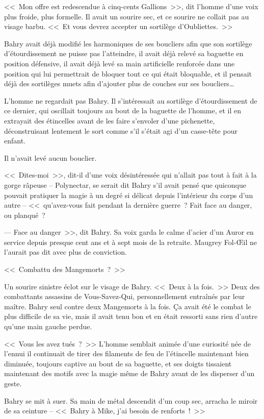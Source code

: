 <<~Mon offre est redescendue à cinq-cents Gallions~>>, dit l'homme d'une voix plus froide, plus formelle. Il avait un sourire sec, et ce sourire ne collait pas au visage barbu. <<~Et vous devrez accepter un sortilège d'Oubliettes.~>>

Bahry avait déjà modifié les harmoniques de ses boucliers afin que son sortilège d'étourdissement ne puisse pas l'atteindre, il avait déjà relevé sa baguette en position défensive, il avait déjà levé sa main artificielle renforcée dans une position qui lui permettrait de bloquer tout ce qui était bloquable, et il pensait déjà des sortilèges muets afin d'ajouter plus de couches sur ses boucliers…

L'homme ne regardait pas Bahry. Il s'intéressait au sortilège d'étourdissement de ce dernier, qui oscillait toujours au bout de la baguette de l'homme, et il en extrayait des étincelles avant de les faire s'envoler d'une pichenette, déconstruisant lentement le sort comme s'il s'était agi d'un casse-tête pour enfant.

Il n'avait levé aucun bouclier.

<<~Dites-moi~>>, dit-il d'une voix désintéressée qui n'allait pas tout à fait à la gorge râpeuse -- Polynectar, se serait dit Bahry s'il avait pensé que quiconque pouvait pratiquer la magie à un degré si délicat depuis l'intérieur du corps d'un autre -- <<~qu'avez-vous fait pendant la dernière guerre~? Fait face au danger, ou planqué~?

--- Face au danger~>>, dit Bahry. Sa voix garda le calme d'acier d'un Auror en service depuis presque cent ans et à sept mois de la retraite. Maugrey Fol-Œil ne l'aurait pas dit avec plus de conviction.

<<~Combattu des Mangemorts~?~>>

Un sourire sinistre éclot sur le visage de Bahry. <<~Deux à la fois.~>> Deux des combattants assassins de Vous-Savez-Qui, personnellement entraînés par leur maître. Bahry seul contre deux Mangemorts à la fois. Ça avait été le combat le plus difficile de sa vie, mais il avait tenu bon et en était ressorti sans rien d'autre qu'une main gauche perdue.

<<~Vous les avez tués~?~>> L'homme semblait animée d'une curiosité née de l'ennui il continuait de tirer des filaments de feu de l'étincelle maintenant bien diminuée, toujours captive au bout de sa baguette, et ses doigts tissaient maintenant des motifs avec la magie même de Bahry avant de les disperser d'un geste.

Bahry se mit à suer. Sa main de métal descendit d'un coup sec, arracha le miroir de sa ceinture -- <<~Bahry à Mike, j'ai besoin de renforts~!~>>

